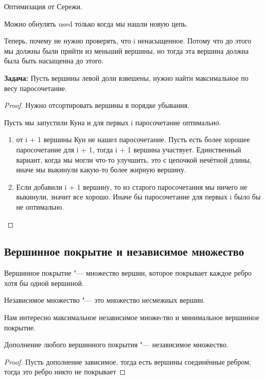 Оптимизация от Сережи.

Можно обнулять used только когда мы нашли новую цепь.  

Теперь, почему не нужно проверять, что i ненасыщенное. Потому что до этого мы должны были прийти из меньший вершины, 
но тогда эта вершина должна была быть насыщенна до этого. 


\textbf{Задача:} Пусть вершины левой доли взвешены, нужно найти максимальное по весу паросочетание. 

\begin{proof}
Нужно отсортировать вершины в порядке убывания. 

Пусть мы запустили Куна и для первых i паросочетание оптимально. 
\begin{enumerate}
    \item от i + 1 вершины Кун не нашел паросочетание. Пусть есть более хорошее паросочетание для i + 1,
    тогда i + 1  вершина участвует. Единственный вариант, когда мы могли что-то улучшить, это с цепочкой нечётной длины,
    иначе мы выкинули какую-то более жирную вершину.  
    \item Если добавили i + 1 вершину, то из старого паросочетания мы ничего не выкинули, значит все хорошо. Иначе бы паросочетание для первых i 
    было бы не оптимально. 
\end{enumerate}
\end{proof}

\subsection{Вершинное покрытие и независимое множество}
\begin{Def}
Вершинное покрытие "--- множество вершин, которое покрывает каждое ребро хотя бы одной вершиной.
\end{Def}
\begin{Def}
Независимое множество "--- это множество несмежных вершин.
\end{Def}

Нам интересно максимальное независимое множеcтво и минимальное вершинное покрытие.

\begin{theorem}{}
Дополнение любого вершинного покрытия "--- независимое множество.
\end{theorem}
\begin{proof}
Пусть дополнение зависимое, тогда есть вершины соединённые ребром, тогда это ребро 
никто не покрывает
\end{proof}

